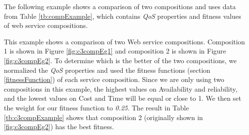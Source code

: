 The following example shows a comparison of two compositions and uses data from Table \ref{tb:compExample}, which contains \emph{QoS} properties and fitness values of web service compositions. \\

\begin{exmp}
This example shows a comparison of two Web service compositions. Composition 1 is shown in Figure \ref{fig:c3compEg1} and composition  2 is shown in Figure \ref{fig:c3compEg2}. To determine which is the better of the two compositions, we normalized the \emph{QoS} properties and used the fitness functions (section \ref{fitnessFunction}) of each service composition. Since we are only using two compositions in this example, the highest values on Availability and reliability, and the lowest values on Cost and Time will be equal or close to 1. We then set the weight for our fitness function to \emph{0.25}. The result in Table \ref{tb:c3compExample} shows that composition 2 (originally shown in \ref{fig:c3compEg2}) has the best fitness.  
\end{exmp}

\begin{table}[H]
\centering
\caption{Comparison of two web service compositions}
\label{tb:compExample}
\end{table}

